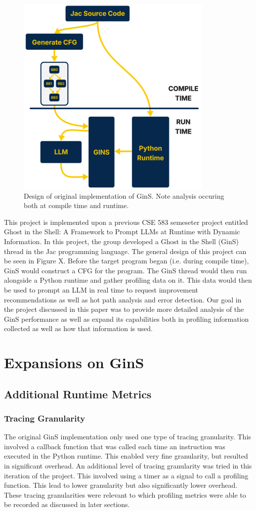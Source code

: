 \documentclass[sigconf]{acmart}
\begin{document}
\begin{figure}
    \centering
    \includegraphics[width=0.5\linewidth]{images/Picture1.png}
    \caption{Design of original implementation of GinS. Note analysis occuring both at compile time and runtime.}
    \label{fig:enter-label}
\end{figure}

This project is implemented upon a previous CSE 583 semeseter project entitled Ghost in the Shell: A Framework to Prompt LLMs at Runtime with Dynamic Information.
In this project, the group developed a Ghost in the Shell (GinS) thread in the Jac programming language.
The general design of this project can be seen in Figure X.
Before the target program began (i.e. during compile time), GinS would construct a CFG for the program.
The GinS thread would then run alongside a Python runtime and gather profiling data on it.
This data would then be used to prompt an LLM in real time to request improvement recommendations as well as hot path analysis and error detection.
Our goal in the project discussed in this paper was to provide more detailed analysis of the GinS performance as well as expand its capabilities both in profiling information collected as well as how that information is used.

\section{Expansions on GinS}

\subsection{Additional Runtime Metrics}
\subsubsection{Tracing Granularity}
The original GinS implementation only used one type of tracing granularity. This involved a callback function that was called each time an instruction was executed in the Python runtime. This enabled very fine granularity, but resulted in significant overhead. An additional level of tracing granularity was tried in this iteration of the project. This involved using a timer as a signal to call a profiling function. This lead to lower granularity but also significantly lower overhead. These tracing granularities were relevant to which profiling metrics were able to be recorded as discussed in later sections.
\end{document}

